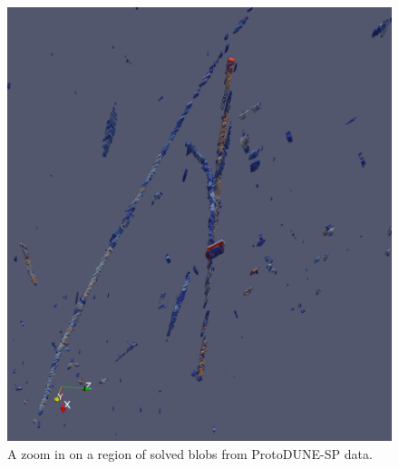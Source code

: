 \documentclass[11pt]{article}
\begin{document}
\begin{figure}[htbp]
\centering
\includegraphics[width=\textwidth]{figs/pdsp-data.pdf}
\caption{\label{fig:pdspdata}
A zoom in on a region of solved blobs from ProtoDUNE-SP data.}
\end{figure}
\end{document}
